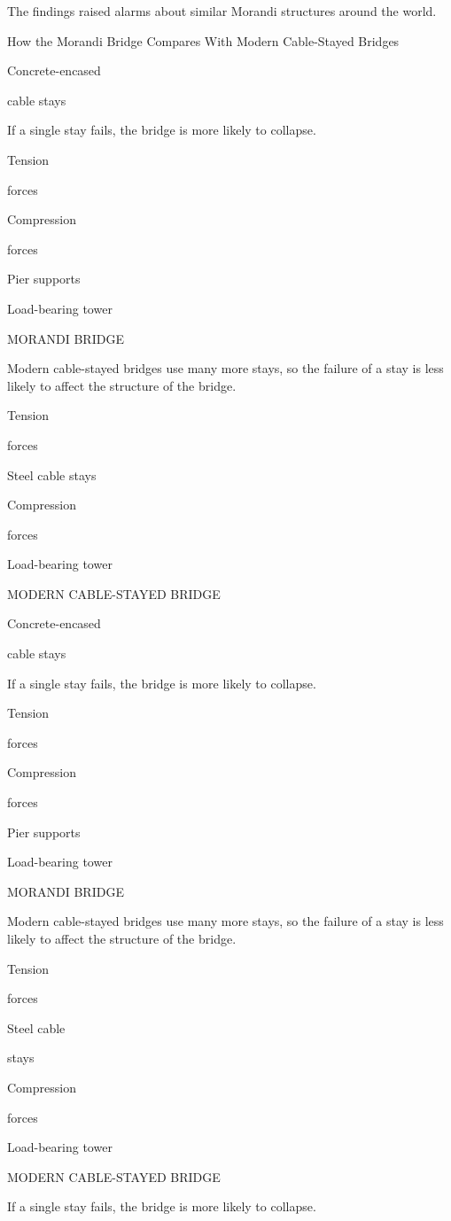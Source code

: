 The findings raised alarms about similar Morandi structures around the
world.

How the Morandi Bridge Compares With Modern Cable-Stayed Bridges

Concrete-encased

cable stays

If a single stay fails, the bridge is more likely to collapse.

Tension

forces

Compression

forces

Pier supports

Load-bearing tower

MORANDI BRIDGE

Modern cable-stayed bridges use many more stays, so the failure of a
stay is less likely to affect the structure of the bridge.

Tension

forces

Steel cable stays

Compression

forces

Load-bearing tower

MODERN CABLE-STAYED BRIDGE

Concrete-encased

cable stays

If a single stay fails, the bridge is more likely to collapse.

Tension

forces

Compression

forces

Pier supports

Load-bearing tower

MORANDI BRIDGE

Modern cable-stayed bridges use many more stays, so the failure of a
stay is less likely to affect the structure of the bridge.

Tension

forces

Steel cable

stays

Compression

forces

Load-bearing tower

MODERN CABLE-STAYED BRIDGE

If a single stay fails, the bridge is more likely to collapse.

